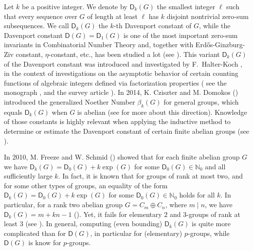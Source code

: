 \documentclass[11pt]{amsart}
\theoremstyle{definition}
\numberwithin{equation}{section}
\begin{document}
Let $k$ be a positive integer. 
We denote by $\mathsf{D}_k(G)$ the smallest integer $\ell$ such that every sequence over $G$
of length at least $\ell$ has $k$ disjoint nontrivial zero-sum subsequences.  We call $\mathsf{D}_k(G)$ the $k$-th Davenport constant of $G$, while the Davenport constant $\mathsf D(G)=\mathsf D_1(G)$ is one of the most important zero-sum invariants in Combinatorial Number Theory and,  together with Erd\H os-Ginzburg-Ziv constant,  $\eta$-constant, etc., has been studied a lot (see \cite{Ho-Zh24,Na20,Ad-Gr-Su12,Gi18, Si20,Olson-rk2,Gi-Sc19a,Fa-Ga-Zh11a,Ga-Ha-Pe-Su14,Li20,Bi-Gr-He20,Qu-Li-Te22,Br-Ri18a,Ed-El-Ge-Ku-Ra07,Ca96a,Ga-Lu08a,Ha-Zh19}). 
This variant $\mathsf D_k(G)$ of the Davenport constant was introduced and investigated by F.~Halter-Koch \cite{halterkoch92}, in the context of investigations on the asymptotic behavior of certain counting functions of algebraic integers defined via factorization properties ( see the monograph \cite[Section 6.1]{Ger-book},  and the survey article \cite[Section 5]{gaogeroldingersurvey}).
In 2014, K. Cziszter and M. Domokos (\cite{Cz-Do14,Cz-Do13c}) introduced the generalized Noether Number $\beta_k(G)$ for general groups, which equals $\mathsf D_k(G)$ when $G$ is abelian (see \cite{Cz-Do-Ge16,Cz-Do-Sz17,Cz-Do14a} for more about this direction).
Knowledge of those constants is highly relevant when applying the inductive method to determine or estimate the Davenport constant of certain finite abelian groups (see \cite{delormeetal01,bhowmikschalge07,bhowmikhallschlage,Pl-Sc11}).



In 2010, M. Freeze and W. Schmid (\cite{Fr-Sc10}) showed that for each finite abelian group $G$ we have $\mathsf{D}_k(G)= \mathsf{D}_0(G)+ k\exp(G)$ for some $\mathsf{D}_0(G)\in \mathbb{N}_0$ and all sufficiently large $k$.
In fact, it is known that for groups of rank at most two, and for some other types of groups, an equality of the form $\mathsf{D}_k(G)= \mathsf{D}_0(G)+ k\exp(G)$ for some $\mathsf{D}_0(G)\in \mathbb{N}_0$ holds for all $k$. In particular, for a rank two abelian group $G=C_m\oplus C_n$, where $m\mid n$, we have $\mathsf D_k(G)=m+kn-1$ (\cite[Theorem 6.1.5]{Ger-book}). 
Yet, it fails for elementary $2$ and $3$-groups of rank at least $3$ (see \cite{delormeetal01,bhowmikschalge07}). In general, computing (even bounding) $\mathsf D_k(G)$ is quite more complicated than for $\mathsf D(G)$, in particular for (elementary) $p$-groups, while $\mathsf D(G)$ is know for $p$-groups.
\end{document}
